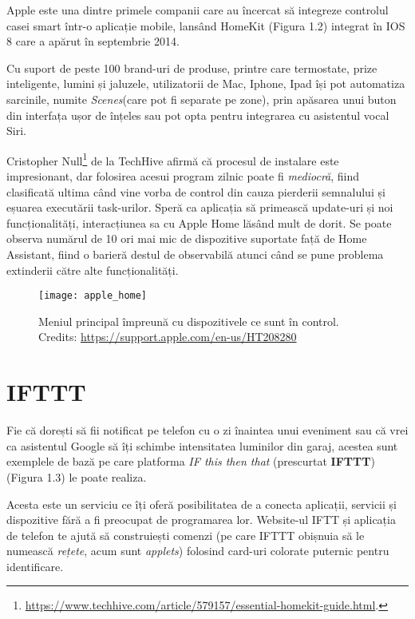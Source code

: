 Apple este una dintre primele companii care au încercat să integreze controlul casei smart într-o aplicație mobile, lansând HomeKit (Figura 1.2) integrat în IOS 8 care a apărut în septembrie 2014.

Cu suport de peste 100 brand-uri de produse, printre care termostate, prize inteligente, lumini și jaluzele, utilizatorii de Mac, Iphone, Ipad își pot automatiza sarcinile, numite \emph{Scenes}(care pot fi separate pe zone), prin apăsarea unui buton din interfața ușor de înțeles sau pot opta pentru integrarea cu asistentul vocal Siri.

Cristopher Null\footnote{\url{https://www.techhive.com/article/579157/essential-homekit-guide.html}.} de la TechHive afirmă că procesul de instalare este impresionant, dar folosirea acesui program zilnic poate fi \emph{mediocră}, fiind clasificată ultima când vine vorba de control din cauza pierderii semnalului și eșuarea executării task-urilor. Speră ca aplicația să primească update-uri și noi funcționalități, interacțiunea sa cu Apple Home lăsând mult de dorit. Se poate observa numărul de 10 ori mai mic de dispozitive suportate față de Home Assistant, fiind o barieră destul de observabilă atunci când se pune problema extinderii către alte funcționalități.

\begin{figure}[h]
	\centering
	\texttt{[image: apple\_home]}
	\caption{Meniul principal împreună cu dispozitivele ce sunt în control.
		Credits: \url{https://support.apple.com/en-us/HT208280}}
	\label{fig:apple_home}
\end{figure} 


\section{IFTTT}

Fie că dorești să fii notificat pe telefon cu o zi înaintea unui eveniment sau că vrei ca asistentul Google să îți schimbe intensitatea luminilor din garaj, acestea sunt exemplele de bază pe care platforma \emph{IF this then that} (prescurtat \textbf{IFTTT}) (Figura 1.3) le poate realiza.

Acesta este un serviciu ce îți oferă posibilitatea de a conecta aplicații, servicii și dispozitive fără a fi preocupat de programarea lor. Website-ul IFTT și aplicația de telefon te ajută să construiești comenzi (pe care IFTTT obișnuia să le numească \emph{rețete}, acum sunt \emph{applets}) folosind card-uri colorate puternic pentru identificare.

